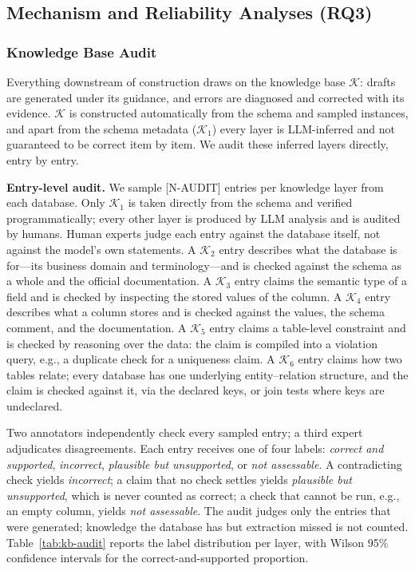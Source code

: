 \documentclass[letterpaper,journal]{IEEEtran}
\begin{document}
\subsection{Mechanism and Reliability Analyses (RQ3)}

\subsubsection{Knowledge Base Audit}
\label{subsec:kb-audit}

Everything downstream of construction draws on the knowledge base $\mathcal{K}$: drafts are generated under its guidance, and errors are diagnosed and corrected with its evidence. $\mathcal{K}$ is constructed automatically from the schema and sampled instances, and apart from the schema metadata ($\mathcal{K}_1$) every layer is LLM-inferred and not guaranteed to be correct item by item. We audit these inferred layers directly, entry by entry.

\textbf{Entry-level audit.} We sample [N-AUDIT] entries per knowledge layer from each database. Only $\mathcal{K}_1$ is taken directly from the schema and verified programmatically; every other layer is produced by LLM analysis and is audited by humans. Human experts judge each entry against the database itself, not against the model's own statements. A $\mathcal{K}_2$ entry describes what the database is for---its business domain and terminology---and is checked against the schema as a whole and the official documentation. A $\mathcal{K}_3$ entry claims the semantic type of a field and is checked by inspecting the stored values of the column. A $\mathcal{K}_4$ entry describes what a column stores and is checked against the values, the schema comment, and the documentation. A $\mathcal{K}_5$ entry claims a table-level constraint and is checked by reasoning over the data: the claim is compiled into a violation query, e.g., a duplicate check for a uniqueness claim. A $\mathcal{K}_6$ entry claims how two tables relate; every database has one underlying entity--relation structure, and the claim is checked against it, via the declared keys, or join tests where keys are undeclared.

Two annotators independently check every sampled entry; a third expert adjudicates disagreements. Each entry receives one of four labels: \emph{correct and supported}, \emph{incorrect}, \emph{plausible but unsupported}, or \emph{not assessable}. A contradicting check yields \emph{incorrect}; a claim that no check settles yields \emph{plausible but unsupported}, which is never counted as correct; a check that cannot be run, e.g., an empty column, yields \emph{not assessable}. The audit judges only the entries that were generated; knowledge the database has but extraction missed is not counted. Table~\ref{tab:kb-audit} reports the label distribution per layer, with Wilson 95\% confidence intervals for the correct-and-supported proportion.
\end{document}
